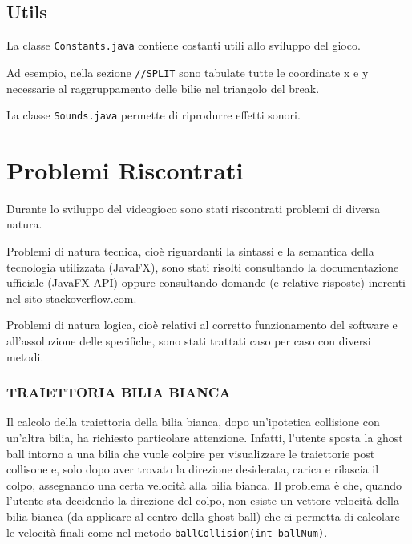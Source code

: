 \documentclass[12pt,a4paper]{report}
\begin{document}
\subsection{Utils} \label{se:Utils} %
La classe \texttt{Constants.java} contiene costanti utili allo sviluppo del gioco.

Ad esempio, nella sezione \texttt{//SPLIT} sono tabulate tutte le coordinate x e y necessarie al raggruppamento delle bilie nel triangolo del break.

\vspace{3mm}

La classe \texttt{Sounds.java} permette di riprodurre effetti sonori.

\section{Problemi Riscontrati} \label{se:Issues} %
Durante lo sviluppo del videogioco sono stati riscontrati problemi di diversa natura.

\vspace{3mm}

Problemi di natura tecnica, cioè riguardanti la sintassi e la semantica della tecnologia utilizzata (JavaFX), sono stati risolti consultando la documentazione ufficiale (JavaFX API) oppure consultando domande (e relative risposte) inerenti nel sito stackoverflow.com.

\vspace{3mm}

Problemi di natura logica, cioè relativi al corretto funzionamento del software e all'assoluzione delle specifiche, sono stati trattati caso per caso con diversi metodi.

\subsubsection*{TRAIETTORIA BILIA BIANCA}
Il calcolo della traiettoria della bilia bianca, dopo un'ipotetica collisione con un'altra bilia, ha richiesto particolare attenzione.
Infatti, l'utente sposta la ghost ball intorno a una bilia che vuole colpire per visualizzare le traiettorie post collisone e, solo dopo aver trovato la direzione desiderata, carica e rilascia il colpo, assegnando una certa velocità alla bilia bianca.
Il problema è che, quando l'utente sta decidendo la direzione del colpo, non esiste un vettore velocità della bilia bianca (da applicare al centro della ghost ball) che ci permetta di calcolare le velocità finali come nel metodo \texttt{ballCollision(int ballNum)}.
\end{document}
